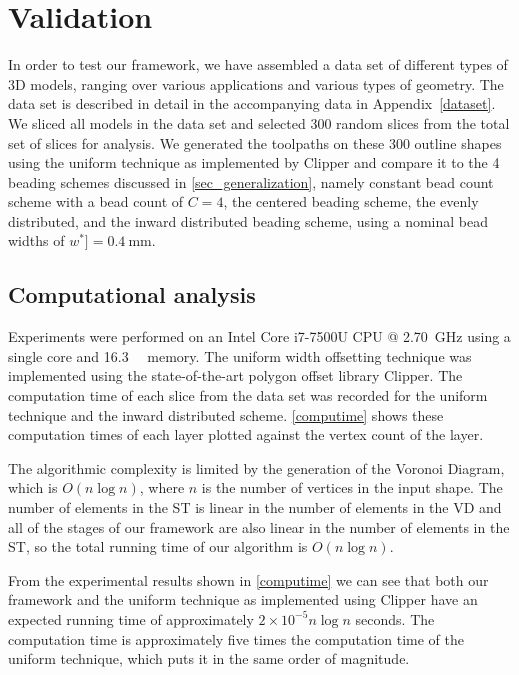 \section{Validation}
In order to test our framework, we have assembled a data set of different types of 3D models, ranging over various applications and various types of geometry.
The data set is described in detail in the accompanying data in Appendix~\ref{dataset}.
We sliced all models in the data set and selected 300 random slices from the total set of slices for analysis.
We generated the toolpaths on these 300 outline shapes using the uniform technique as implemented by Clipper and compare it to the 4 beading schemes discussed in \cref{sec_generalization}, namely constant bead count scheme with a bead count of $C=4$, the centered beading scheme, the evenly distributed, and the inward distributed beading scheme, using a nominal bead widths of $w^*] = \SI{0.4}{\milli\meter}$.



\subsection{Computational analysis}
Experiments were performed on an Intel Core i7-7500U CPU @ \SI{2.70}{\giga\hertz} using a single core and \SI{16.3}{\giga\byte} memory.
The uniform width offsetting technique was implemented using the state-of-the-art polygon offset library Clipper. \cite{johnson2014clipper}
The computation time of each slice from the data set was recorded for the uniform technique and the inward distributed scheme. 
\cref{computime} shows these computation times of each layer plotted against the vertex count of the layer.

The algorithmic complexity is limited by the generation of the Voronoi Diagram, which is $O(n \log n)$, where $n$ is the number of vertices in the input shape.
The number of elements in the ST is linear in the number of elements in the VD
and all of the stages of our framework are also linear in the number of elements in the ST,
so the total running time of our algorithm is $O(n \log n)$.

From the experimental results shown in \cref{computime} we can see that both our framework and the uniform technique as implemented using Clipper have an expected running time of approximately $2 \times 10^{-5} n \log n$ seconds.
The computation time is approximately five times the computation time of the uniform technique, which puts it in the same order of magnitude.

